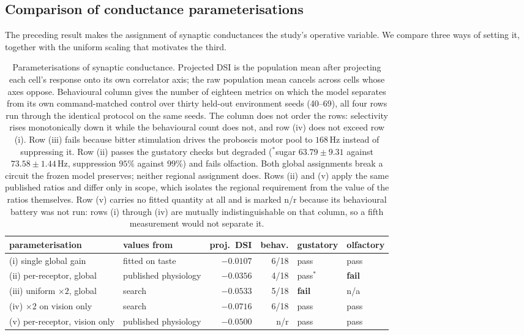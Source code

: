 \documentclass[10pt,twoside]{article}
\begin{document}
\subsection{Comparison of conductance parameterisations}
\label{sec:threeway}

The preceding result makes the assignment of synaptic conductances the
study's operative variable. We compare three ways of setting it, together with
the uniform scaling that motivates the third.

\begin{table}[t]\centering
\small
\begin{tabular}{llrrll}
\toprule
parameterisation & values from & proj.\ DSI & behav. & gustatory & olfactory\\
\midrule
(i) single global gain & fitted on taste & $-0.0107$ & 6/18 & pass & pass\\
(ii) per-receptor, global & published physiology & $-0.0356$ & 4/18 & pass$^{*}$ & \textbf{fail}\\
(iii) uniform $\times2$, global & search & $-0.0533$ & 5/18 & \textbf{fail} & n/a\\
(iv) $\times2$ on vision only & search & $\mathbf{-0.0716}$ & 6/18 & pass & pass\\
(v) per-receptor, vision only & published physiology & $-0.0500$ & n/r & pass & pass\\
\bottomrule
\end{tabular}
\caption{Parameterisations of synaptic conductance. Projected DSI is the
population mean after projecting each cell's response onto its own correlator
axis; the raw population mean cancels across cells whose axes oppose.
Behavioural column gives the number of eighteen metrics on which the model
separates from its own command-matched control over thirty held-out
environment seeds (40--69), all four rows run through the identical protocol
on the same seeds. The column does not order the rows: selectivity rises
monotonically down it while the behavioural count does not, and row (iv) does
not exceed row (i). Row (iii) fails because bitter stimulation drives the proboscis motor
pool to $168$\,Hz instead of suppressing it. Row (ii) passes the gustatory
checks but degraded ($^{*}$sugar $63.79\pm9.31$ against $73.58\pm1.44$\,Hz,
suppression $95\%$ against $99\%$) and fails olfaction. Both global
assignments break a circuit the frozen model preserves; neither regional
assignment does. Rows (ii) and (v) apply the same published ratios and differ
only in scope, which isolates the regional requirement from the value of the
ratios themselves. Row (v) carries no fitted quantity at all and is marked
n/r because its behavioural battery was not run: rows (i) through (iv) are
mutually indistinguishable on that column, so a fifth measurement would not
separate it.}
\label{tab:threeway}
\end{table}
\end{document}
